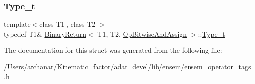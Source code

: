 \mbox{\label{structBinaryReturn_3_01T1_00_01T2_00_01OpBitwiseAndAssign_01_4_af047665bd1eeb8cd1c5b11049e4652a7}} 
\subsubsection{\texorpdfstring{Type\_t}{Type\_t}\hspace{0.1cm}{\footnotesize\ttfamily [2/2]}}
{\footnotesize\ttfamily template$<$class T1 , class T2 $>$ \\
typedef T1\& \mbox{\hyperlink{structBinaryReturn}{Binary\+Return}}$<$ T1, T2, \mbox{\hyperlink{structOpBitwiseAndAssign}{Op\+Bitwise\+And\+Assign}} $>$\+::\mbox{\hyperlink{structBinaryReturn_3_01T1_00_01T2_00_01OpBitwiseAndAssign_01_4_af047665bd1eeb8cd1c5b11049e4652a7}{Type\+\_\+t}}}



The documentation for this struct was generated from the following file\+:\begin{DoxyCompactItemize}
\item 
/\+Users/archanar/\+Kinematic\+\_\+factor/adat\+\_\+devel/lib/ensem/\mbox{\hyperlink{lib_2ensem_2ensem__operator__tags_8h}{ensem\+\_\+operator\+\_\+tags.\+h}}\end{DoxyCompactItemize}
